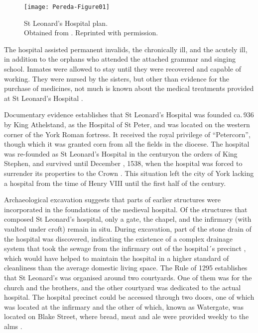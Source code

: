 \begin{figure} 		\texttt{[image: Pereda-Figure01]}
 		\caption{St Leonard’s Hospital plan.
    {\normalfont\scriptsize \\ Obtained from \textcite[100]{Dean_2008}.
		Reprinted with permission.
              }}
 		\label{fig:Pereda-Figure01}
 	\end{figure}
 The hospital assisted permanent invalids, the chronically ill, and the acutely ill, in addition to the orphans who attended the attached grammar and singing school. Inmates were allowed to stay until they were recovered and capable of working. They were nursed by the sisters, but other than evidence for the purchase of medicines, not much is known about the medical treatments provided at St Leonard’s Hospital \parencites[5,12-15]{Cullum_1991}[21]{Dainton_1961}[97]{Dean_2008}[134]{Goldberg_1992}{Page_1974}[78,109]{Palliser_2014}.
 
Documentary evidence establishes that St Leonard’s Hospital was founded ca.\,936 by King Athelstand, as the Hospital of St Peter, and was located on the western corner of the York Roman fortress. It received the royal privilege of “Petercorn”, though which it was granted corn from all the fields in the diocese. The hospital was re-founded as St Leonard’s Hospital in the  century\AD on the orders of King Stephen, and survived until December , 1538, when the hospital was forced to surrender its properties to the Crown 
\parencite[288]{Palliser_2014}. This situation left the city of York lacking a hospital from the time of Henry VIII until the first half of the  century\AD \parencite{YorkMuseumGardens_2016}.

Archaeological excavation suggests that parts of earlier structures were incorporated in the foundations of the medieval hospital. Of the structures that composed St Leonard’s hospital, only a gate, the chapel, and the infirmary (with vaulted under croft) remain in situ. During excavation, part of the stone drain of the hospital was discovered, indicating the existence of a complex drainage system that took the sewage from the infirmary out of the hospital´s precinct \parencite{Johnson_2014}, which would have helped to maintain the hospital in a higher standard of cleanliness than the average domestic living space.
The Rule of 1295 establishes that St Leonard’s was organised around two courtyards. One of them was for the church and the brothers, and the other courtyard was dedicated to the actual hospital. The hospital precinct could be accessed through two doors, one of which was located at the infirmary and the other of which, known as Watergate, was located on Blake Street, where bread, meat and ale were provided weekly to the alms \parencites[8-9,28-29]{Cullum_1991}[17]{Cullum_1999}{Johnson_2014}[151]{Palliser_2014}[116]{Raine_1955}[314]{Rawcliffe_2004}.


